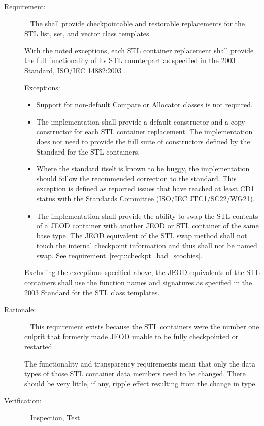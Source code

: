 \label{reqt:stl_containers}
\begin{description}
\item[Requirement:]\ \newline
  The \ModelDesc shall provide checkpointable and restorable replacements for
  the STL list, set, and vector class templates.

  \label{reqt::stl_container_equiv}
  With the noted exceptions, each STL container replacement shall
  provide the full functionality of its STL counterpart as specified in
  the 2003 \Cplusplus Standard, ISO/IEC 14882:2003 \cite{cpp2003}.

  Exceptions:\begin{itemize}
  \item Support for non-default Compare or Allocator classes is not required.
  \item The implementation shall provide a default constructor and
        a copy constructor for each STL container replacement.
        The implementation does not need to provide the full suite of
        constructors defined by the Standard for the STL containers.
  \item Where the standard itself is known to be buggy, the implementation
        should follow the recommended correction to the standard.
        This exception is defined as reported issues that have
        reached at least CD1 status with the \Cplusplus Standards Committee
        (ISO/IEC JTC1/SC22/WG21).
  \item The implementation shall provide the ability to swap the STL contents
        of a JEOD container with another JEOD or STL container of the same base
        type.
        The JEOD equivalent of the STL swap method shall not touch the
        internal checkpoint information and thus shall not be named swap.
        See requirement~\ref{reqt::checkpt_bad_scoobies}.
  \end{itemize}

  \label{reqt::stl_container_trans}
  Excluding the exceptions specified above, the JEOD equivalents of the
  STL containers shall use the function names and signatures as
  specified in the 2003 \Cplusplus Standard for the STL class templates.

\item[Rationale:]\ \newline
  This requirement exists because the STL containers were the number one
  culprit that formerly made JEOD unable to be fully checkpointed or restarted.

  The functionality and transparency requirements mean that only the
  data types of those STL container data members need to be changed.
  There should be very little, if any, ripple effect resulting from the
  change in type.

\item[Verification:]\ \newline
  Inspection, Test
\end{description}